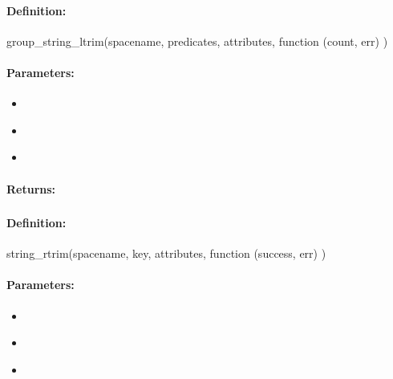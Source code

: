 \paragraph{Definition:}
\begin{javascriptcode}
group_string_ltrim(spacename, predicates, attributes, function (count, err) {})
\end{javascriptcode}
\paragraph{Parameters:}
\begin{itemize}[noitemsep]
\item {}\\

\item {}\\

\item {}\\

\end{itemize}

\paragraph{Returns:}


\pagebreak
\subsubsection{}
\label{api:nodejs:string_rtrim}


\paragraph{Definition:}
\begin{javascriptcode}
string_rtrim(spacename, key, attributes, function (success, err) {})
\end{javascriptcode}
\paragraph{Parameters:}
\begin{itemize}[noitemsep]
\item {}\\

\item {}\\

\item {}\\

\end{itemize}

